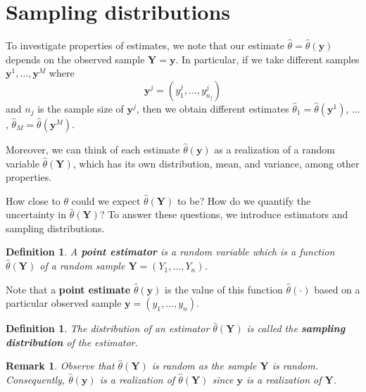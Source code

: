 \documentclass[10pt]{article}
\theoremstyle{newstyle}
\newtheorem{remark}[thm]{Remark}
\newtheorem{defn}[thm]{Definition}
\begin{document}
\newpage 
\section{Sampling distributions}

To investigate properties of estimates, we note that our estimate $\hat\theta = \hat\theta(\mathbf y)$ 
depends on the observed sample $\mathbf Y = \mathbf y$. In particular, if we take different 
samples $\mathbf y^1, \dots, \mathbf y^M$ where 
\[ \mathbf y^j = (y_1^j, \dots, y_{n_j}^j) \] 
and $n_j$ is the sample size of $\mathbf y^j$, then we obtain different estimates 
$\hat\theta_1 = \hat\theta(\mathbf y^1)$, $\dots$, $\hat\theta_M = \hat\theta(\mathbf y^M)$. 

Moreover, we can think of each estimate $\hat\theta(\mathbf y)$ as a realization of a random variable 
$\hat\theta(\mathbf Y)$, which has its own distribution, mean, and variance, among other properties.

How close to $\theta$ could we expect $\hat\theta(\mathbf Y)$ to be? How do we quantify the 
uncertainty in $\hat\theta(\mathbf Y)$? To answer these questions, we introduce estimators 
and sampling distributions. 

\begin{defn}
A {\bf point estimator} is a random variable which is a function $\hat\theta(\mathbf Y)$ of a random 
sample $\mathbf Y = (Y_1, \dots, Y_n)$. 
\end{defn}

Note that a {\bf point estimate} $\hat\theta(\mathbf y)$ is the value of this function 
$\hat\theta(\cdot)$ based on a particular observed sample $\mathbf y = (y_1, \dots, y_n)$. 

\begin{defn}
The distribution of an estimator $\hat\theta(\mathbf Y)$ is called the {\bf sampling distribution} 
of the estimator. 
\end{defn}

\begin{remark}
Observe that $\hat\theta(\mathbf Y)$ is random as the sample $\mathbf Y$ is random. 
Consequently, $\hat\theta(\mathbf y)$ is a realization of $\hat\theta(\mathbf Y)$ since 
$\mathbf y$ is a realization of $\mathbf Y$. 
\end{remark}
\end{document}
